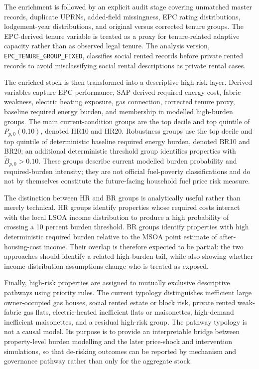 The enrichment is followed by an explicit audit stage covering unmatched master records, duplicate UPRNs, added-field missingness, EPC rating distributions, lodgement-year distributions, and original versus corrected tenure groups. The EPC-derived tenure variable is treated as a proxy for tenure-related adaptive capacity rather than as observed legal tenure. The analysis version, \texttt{EPC\_TENURE\_GROUP\_FIXED}, classifies social rented records before private rented records to avoid misclassifying social rental descriptions as private rental cases.

The enriched stock is then transformed into a descriptive high-risk layer. Derived variables capture EPC performance, SAP-derived required energy cost, fabric weakness, electric heating exposure, gas connection, corrected tenure proxy, baseline required energy burden, and membership in modelled high-burden groups. The main current-condition groups are the top decile and top quintile of $P_{p,0}(0.10)$, denoted HR10 and HR20. Robustness groups use the top decile and top quintile of deterministic baseline required energy burden, denoted BR10 and BR20; an additional deterministic threshold group identifies properties with $\widetilde{B}_{p,0}>0.10$. These groups describe current modelled burden probability and required-burden intensity; they are not official fuel-poverty classifications and do not by themselves constitute the future-facing household fuel price risk measure.

The distinction between HR and BR groups is analytically useful rather than merely technical. HR groups identify properties whose required costs interact with the local LSOA income distribution to produce a high probability of crossing a 10 percent burden threshold. BR groups identify properties with high deterministic required burden relative to the MSOA point estimate of after-housing-cost income. Their overlap is therefore expected to be partial: the two approaches should identify a related high-burden tail, while also showing whether income-distribution assumptions change who is treated as exposed.

Finally, high-risk properties are assigned to mutually exclusive descriptive pathways using priority rules. The current typology distinguishes inefficient large owner-occupied gas houses, social rented estate or block risk, private rented weak-fabric gas flats, electric-heated inefficient flats or maisonettes, high-demand inefficient maisonettes, and a residual high-risk group. The pathway typology is not a causal model. Its purpose is to provide an interpretable bridge between property-level burden modelling and the later price-shock and intervention simulations, so that de-risking outcomes can be reported by mechanism and governance pathway rather than only for the aggregate stock.

